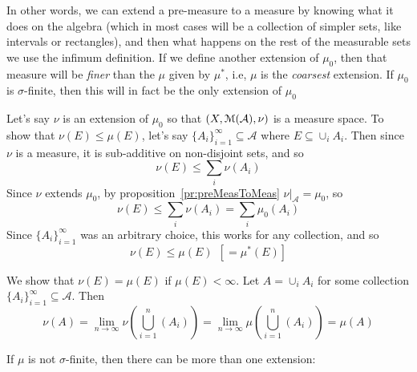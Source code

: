 \documentclass[oneside]{book}
\newcommand{\CA}{\mathcal{A}}
\newcommand{\MM}{\EuScript{M}}
\newcommand{\sse}{\subseteq}
\newcommand{\rw}{\rightarrow}
\begin{document}
In other words, we can extend a pre-measure to a measure by knowing what it does on the algebra (which in most cases
will be a collection of simpler sets, like intervals or rectangles), and then what happens on the rest of the measurable
sets we use the infimum definition. If we define another extension of $\mu_0$, then that measure will be \emph{finer}
than the $\mu$ given by $\mu^*$, i.e, $\mu$ is the \emph{coarsest} extension. If $\mu_0$ is $\sigma$-finite, then this
will in fact be the only extension of $\mu_0$

\begin{Proof}
	Let's say $\nu$ is an extension of $\mu_0$ so that $(X, \MM(\CA), \nu)$ is a measure space. To show that $\nu(E) \le
	\mu(E)$, let's say $\{A_i\}_{i=1}^\infty \sse \CA$ where $E \sse \cup_i A_i$. Then since $\nu$ is a measure, it is
	sub-additive on non-disjoint sets, and so
	\[
		\nu(E) \le \sum_i\nu(A_i)
	\]
	Since $\nu$ extends $\mu_0$, by proposition~\ref{pr:preMeasToMeas} $\left.\nu\right|_{\CA} = \mu_0$, so
	\[
		\nu(E) \le \sum_i\nu(A_i) = \sum_i\mu_0(A_i)
	\]
	Since  $\{A_i\}_{i=1}^\infty$ was an arbitrary choice, this works for any collection, and so
	\[
		\nu(E) \le \mu(E)\ \ [=\mu^*(E)]
	\]

	We show that $\nu(E) = \mu(E)$ if $\mu(E) < \infty$. Let $A = \cup_i A_i$ for some collection $\{A_i\}_{i=1}^\infty
	\sse \CA$. Then
	\[
		\nu(A) = \lim_{n \rw \infty} \nu\left(\bigcup_{i=1}^n (A_i)\right) = \lim_{n \rw \infty}
		\mu\left(\bigcup_{i=1}^n (A_i)\right)= \mu(A)
	\]

\end{Proof}

If $\mu$ is not $\sigma$-finite, then there can be more than one extension:
\end{document}
